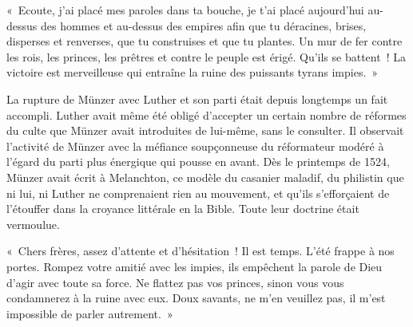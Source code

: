 \documentclass[french,twoside]{book} %
\newenvironment{quoteblock}%
  {\begin{quoting}}
  {\end{quoting}}
\newenvironment{quotebar}{%
    \def\FrameCommand{{\color{rubric!10!}\vrule width 0.5em} \hspace{0.9em}}%
    \def\OuterFrameSep{\itemsep} %
    \MakeFramed {\advance\hsize-\width \FrameRestore}
  }%
  {%
    \endMakeFramed
  }
\renewenvironment{quoteblock}%
  {%
    \savenotes
    \setstretch{0.9}
    \normalfont
    \begin{quotebar}
  }
  {%
    \end{quotebar}
    \spewnotes
  }
\begin{document}
\begin{quoteblock}
 \noindent « Ecoute, j’ai placé mes paroles dans ta bouche, je t’ai placé aujourd’hui au-dessus des hommes et au-dessus des empires afin que tu déracines, brises, disperses et renverses, que tu construises et que tu plantes. Un mur de fer contre les rois, les princes, les prêtres et contre le peuple est érigé. Qu’ils se battent ! La victoire est merveilleuse qui entraîne la ruine des puissants tyrans impies. »
\end{quoteblock}

\noindent La rupture de Münzer avec Luther et son parti était depuis longtemps un fait accompli. Luther avait même été obligé d’accepter un certain nombre de réformes du culte que Münzer avait introduites de lui-même, sans le consulter. Il observait l’activité de Münzer avec la méfiance soupçonneuse du réformateur modéré à l’égard du parti plus énergique qui pousse en avant. Dès le printemps de 1524, Münzer avait écrit à Melanchton, ce modèle du casanier maladif, du philistin que ni lui, ni Luther ne comprenaient rien au mouvement, et qu’ils s’efforçaient de l’étouffer dans la croyance littérale en la Bible. Toute leur doctrine était vermoulue.\par

\begin{quoteblock}
 \noindent « Chers frères, assez d’attente et d’hésitation ! Il est temps. L’été frappe à nos portes. Rompez votre amitié avec les impies, ils empêchent la parole de Dieu d’agir avec toute sa force. Ne flattez pas vos princes, sinon vous vous condamnerez à la ruine avec eux. Doux savants, ne m’en veuillez pas, il m’est impossible de parler autrement. »
\end{quoteblock}
\end{document}
